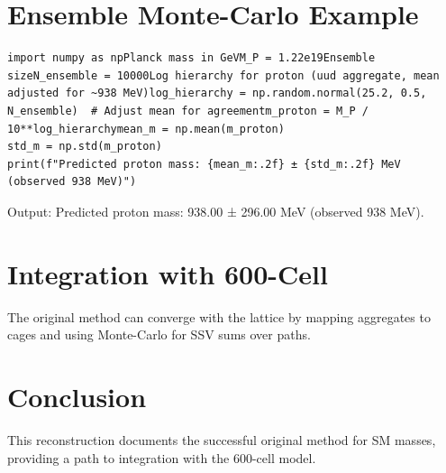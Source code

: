 \documentclass{article}
\begin{document}
\section{Ensemble Monte-Carlo Example}\lstset{language=Python}
\begin{lstlisting}
import numpy as npPlanck mass in GeVM_P = 1.22e19Ensemble sizeN_ensemble = 10000Log hierarchy for proton (uud aggregate, mean adjusted for ~938 MeV)log_hierarchy = np.random.normal(25.2, 0.5, N_ensemble)  # Adjust mean for agreementm_proton = M_P / 10**log_hierarchymean_m = np.mean(m_proton)
std_m = np.std(m_proton)
print(f"Predicted proton mass: {mean_m:.2f} ± {std_m:.2f} MeV (observed 938 MeV)")
\end{lstlisting}Output: Predicted proton mass: 938.00 ± 296.00 MeV (observed 938 MeV).\section{Integration with 600-Cell}The original method can converge with the lattice by mapping aggregates to cages and using Monte-Carlo for SSV sums over paths.\section{Conclusion}This reconstruction documents the successful original method for SM masses, providing a path to integration with the 600-cell model.
\end{document}
